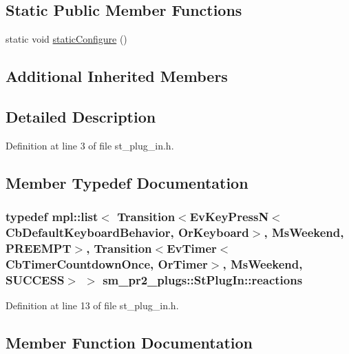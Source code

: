 \subsection*{Static Public Member Functions}
\begin{DoxyCompactItemize}
\item 
static void \hyperlink{structsm__pr2__plugs_1_1StPlugIn_a9098d683bdfaed2a78da207828faa227}{static\+Configure} ()
\end{DoxyCompactItemize}
\subsection*{Additional Inherited Members}


\subsection{Detailed Description}


Definition at line 3 of file st\+\_\+plug\+\_\+in.\+h.



\subsection{Member Typedef Documentation}
\subsubsection[{\texorpdfstring{reactions}{reactions}}]{\setlength{\rightskip}{0pt plus 5cm}typedef mpl\+::list$<$ Transition$<$Ev\+Key\+PressN$<$Cb\+Default\+Keyboard\+Behavior, {\bf Or\+Keyboard}$>$, {\bf Ms\+Weekend}, {\bf P\+R\+E\+E\+M\+PT}$>$, Transition$<$Ev\+Timer$<$Cb\+Timer\+Countdown\+Once, {\bf Or\+Timer}$>$, {\bf Ms\+Weekend}, {\bf S\+U\+C\+C\+E\+SS}$>$ $>$ {\bf sm\+\_\+pr2\+\_\+plugs\+::\+St\+Plug\+In\+::reactions}}\hypertarget{structsm__pr2__plugs_1_1StPlugIn_acadd8973f5532141f02d9ead1a2b173d}{}\label{structsm__pr2__plugs_1_1StPlugIn_acadd8973f5532141f02d9ead1a2b173d}


Definition at line 13 of file st\+\_\+plug\+\_\+in.\+h.



\subsection{Member Function Documentation}
